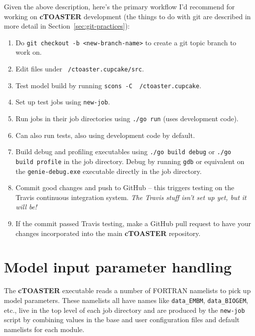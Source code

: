 \documentclass[a4paper,10pt,article]{memoir}
\begin{document}
Given the above description, here's the primary workflow I'd recommend
for working on \textbf{cTOASTER} development (the things to do with git are
described in more detail in Section~\ref{sec:git-practices}):
\begin{enumerate}
  \item{Do \texttt{git checkout -b <new-branch-name>} to create a git
    topic branch to work on.}
  \item{Edit files under \texttt{~/ctoaster.cupcake/src}.}
  \item{Test model build by running \texttt{scons -C ~/ctoaster.cupcake}.}
  \item{Set up test jobs using \texttt{new-job}.}
  \item{Run jobs in their job directories using \texttt{./go run}
    (uses development code).}
  \item{Can also run tests, also using development code by default.}
  \item{Build debug and profiling executables using \texttt{./go build
      debug} or \texttt{./go build profile} in the job directory.
    Debug by running \texttt{gdb} or equivalent on the
    \texttt{genie-debug.exe} executable directly in the job
    directory.}
  \item{Commit good changes and push to GitHub -- this triggers
    testing on the Travis continuous integration system.  \emph{The
      Travis stuff isn't set up yet, but it will be!}}
  \item{If the commit passed Travis testing, make a GitHub pull
    request to have your changes incorporated into the main \textbf{cTOASTER}
    repository.}
\end{enumerate}

\newpage

\section{Model input parameter handling}

The \textbf{cTOASTER} executable reads a number of FORTRAN namelists to pick up
model parameters.  These namelists all have names like
\texttt{data\_EMBM}, \texttt{data\_BIOGEM}, etc., live in the top
level of each job directory and are produced by the \texttt{new-job}
script by combining values in the base and user configuration files
and default namelists for each module.
\end{document}
